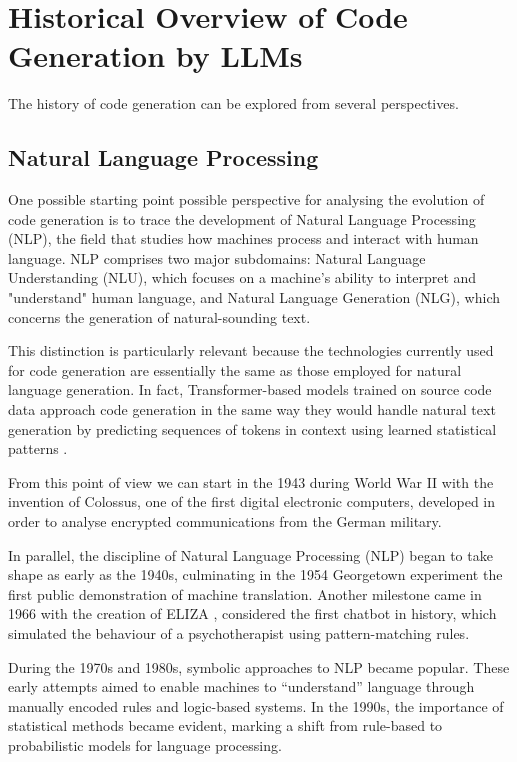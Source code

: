 \clearpage
\section{Historical Overview of Code Generation by LLMs}

The history of code generation can be explored from several 
perspectives. 

\subsection{Natural Language Processing} %
One possible starting point possible perspective for 
analysing the evolution of code generation is to trace
the development of Natural Language Processing (NLP), 
the field that studies how machines process and interact 
with human language. NLP comprises two major subdomains: 
Natural Language Understanding (NLU), which focuses on a 
machine's ability to interpret and "understand" human language, 
and Natural Language Generation (NLG), which concerns the 
generation of natural-sounding text.

This distinction is particularly relevant because 
the technologies currently used for code generation 
are essentially the same as those employed for natural 
language generation. In fact, Transformer-based models 
trained on source code data approach code generation in 
the same way they would handle natural text generation 
by predicting sequences of tokens in context using learned 
statistical patterns \cite{vaswani2017attention}.

From this point of view we can start in the 1943 
during World War II with
the invention of Colossus, one of the first digital electronic computers, 
developed in order to analyse encrypted
communications from the German military.

In parallel, the discipline of Natural Language Processing 
(NLP) began to take shape as early as the 1940s, culminating 
in the 1954 Georgetown experiment the first public demonstration 
of machine translation. Another milestone came in 1966 with the 
creation of ELIZA \cite{weizenbaum1966eliza}, considered the first 
chatbot in history, which simulated the behaviour of a psychotherapist 
using pattern-matching rules.

During the 1970s and 1980s, symbolic approaches to NLP became popular. 
These early attempts aimed to enable machines to “understand” language 
through manually encoded rules and logic-based systems. In the 1990s, 
the importance of statistical methods became evident, marking a shift 
from rule-based to probabilistic models for language processing.

